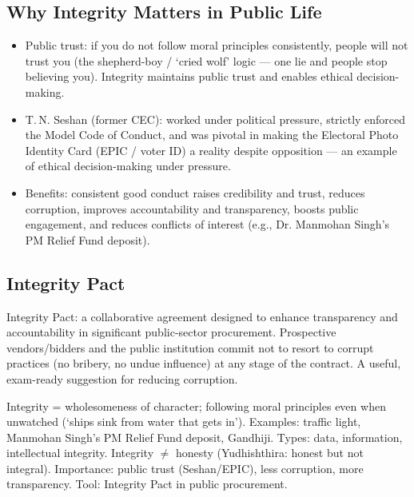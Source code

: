 \subsection{Why Integrity Matters in Public Life}

\begin{itemize}
\item Public trust: if you do not follow moral principles consistently, people will not trust you (the shepherd-boy / `cried wolf' logic --- one lie and people stop believing you). Integrity maintains public trust and enables ethical decision-making.
\item T.\,N. Seshan (former CEC): worked under political pressure, strictly enforced the Model Code of Conduct, and was pivotal in making the Electoral Photo Identity Card (EPIC / voter ID) a reality despite opposition --- an example of ethical decision-making under pressure.
\item Benefits: consistent good conduct raises credibility and trust, reduces corruption, improves accountability and transparency, boosts public engagement, and reduces conflicts of interest (e.g., Dr. Manmohan Singh's PM Relief Fund deposit).
\end{itemize}

\subsection{Integrity Pact}

\begin{GovtPolicy}
Integrity Pact: a collaborative agreement designed to enhance transparency and accountability in significant public-sector procurement. Prospective vendors/bidders and the public institution commit not to resort to corrupt practices (no bribery, no undue influence) at any stage of the contract. A useful, exam-ready suggestion for reducing corruption.
\end{GovtPolicy}

\begin{QuickRevision}
Integrity = wholesomeness of character; following moral principles even when unwatched (`ships sink from water that gets in'). Examples: traffic light, Manmohan Singh's PM Relief Fund deposit, Gandhiji. Types: data, information, intellectual integrity. Integrity $\neq$ honesty (Yudhishthira: honest but not integral). Importance: public trust (Seshan/EPIC), less corruption, more transparency. Tool: Integrity Pact in public procurement.
\end{QuickRevision}

